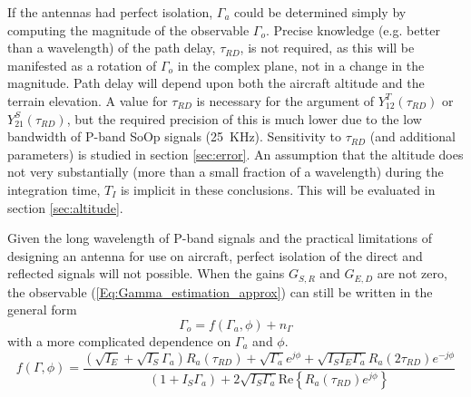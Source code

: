 \documentclass[draftcls,onecolumn]{IEEEtran}  %
\begin{document}
If the antennas had perfect isolation,  $\Gamma_a$ could be determined simply by computing the magnitude of the observable $\Gamma_{o}$.
Precise knowledge (e.g. better than a wavelength) of the path delay, $\tau_{RD}$, is not required,  as this will be manifested as a rotation of $\Gamma_{o}$ in the complex plane, not in a change in the magnitude.   
Path delay will depend upon both the aircraft altitude and the terrain elevation. 
A value for $\tau_{RD}$ is necessary for the argument of $Y^T_{12}(\tau_{RD})$ or $Y^S_{21}(\tau_{RD})$, but  the required precision of this is much lower due to the  low bandwidth of P-band SoOp signals (25~KHz).
Sensitivity to $\tau_{RD}$ (and additional parameters) is studied in section \ref{sec:error}. 
An assumption that the altitude does not very substantially (more than a small fraction of a wavelength) during the integration time, $T_I$ is implicit in   these conclusions.
This will be evaluated  in section \ref{sec:altitude}.


Given the long wavelength of P-band signals and the practical limitations of designing an antenna for use on aircraft,  perfect isolation of the direct and reflected signals will not possible. 
When  the  gains $G_{S,R}$ and $G_{E,D}$ are not zero, the observable (\ref{Eq:Gamma_estimation_approx}) can still be written in the general form 
\begin{equation}
\Gamma_{o} = f(\Gamma_a, \phi) +n_{\Gamma}
  \label{eqn:observation_eqn_general}
\end{equation}
with a more complicated dependence on $\Gamma_a$ and $\phi$. 
\begin{equation}
f(\Gamma, \phi) =
	\frac{(\sqrt{I_E}+\sqrt{I_S}\Gamma_a)R_a(\tau_{RD})+\sqrt{\Gamma_a} 
    e^{j\phi}+\sqrt{I_S I_E\Gamma_a} R_a(2\tau_{RD})e^{-j\phi}} 
    {(1 + I_S \Gamma_a) + 2 \sqrt{I_S \Gamma_a} \mathrm{Re}\left\{ R_a(\tau_{RD}) e^{j \phi} \right\} }
        \label{Eq:Gamma_estimation}
\end{equation}
\end{document}

